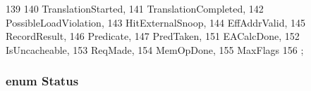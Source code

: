 \begin{DoxyCode}
139                {
140         TranslationStarted,
141         TranslationCompleted,
142         PossibleLoadViolation,
143         HitExternalSnoop,
144         EffAddrValid,
145         RecordResult,
146         Predicate,
147         PredTaken,
151         EACalcDone,
152         IsUncacheable,
153         ReqMade,
154         MemOpDone,
155         MaxFlags
156     };
\end{DoxyCode}
\hypertarget{classBaseDynInst_a67a0db04d321a74b7e7fcfd3f1a3f70b}{
\subsubsection[{Status}]{\setlength{\rightskip}{0pt plus 5cm}enum {\bf Status}}}
\label{classBaseDynInst_a67a0db04d321a74b7e7fcfd3f1a3f70b}
